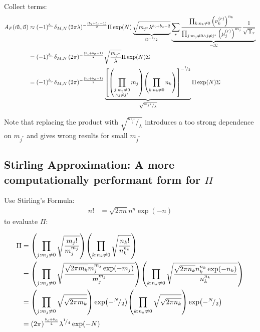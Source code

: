 \documentclass[
	english,
	a4paper,
	fontsize=10pt,
	parskip=half,
	titlepage=true,
	DIV=12,
	final
]{scrreprt}
\newcommand*{\smallfrac}  [2]{\ensuremath{{}^        {#1} \!/_        {#2}}}
\begin{document}
Collect terms:
\begin{align}
		A_F(\vec{m}, \vec{n})
&\approx
	(-1)^{b_o} \,	
	\delta_{M,N} \,
	(2\pi \lambda)^{-\frac{(b_i + b_o - 1)}{2}}
	\Pi
	\exp(N)
	\underbrace{
		\sqrt{m_{j^*} \lambda^{b_i + b_o - 2}}
	}_{\Omega^{-\smallfrac{1}{2}}}
	\underbrace{
		\sum_{r}	
		\frac
			{\prod_{k : n_k \neq 0}                  \qty(\nu_k^{(r)})^{n_k}}
			{\prod_{j : m_j \neq 0 \land j \neq j^*} \qty(\mu_j^{(r)})^{m_j}}
		\frac{1}{\sqrt{\Upsilon_r}}
	}_{\eqqcolon \Sigma} \\
&=
	(-1)^{b_o} \,	
	\delta_{M,N} \,
	(2\pi)^{-\frac{(b_i + b_o - 1)}{2}}
	\sqrt{
		\frac{m_{j^*}}{\lambda}
	}
	\Pi
	\exp(N)
	\Sigma \\
&=
	(-1)^{b_o} \,	
	\delta_{M,N} \,
	(2\pi)^{-\frac{(b_i + b_o - 1)}{2}}
	\underbrace{
		\qty[
			\qty(\prod_{\substack{j : m_j \neq 0\\\land j \neq j^*}} m_j)
			\qty(\prod_{          k : n_k \neq 0                   } n_k)
		]^{-\smallfrac{1}{2}}
	}_{\sqrt{\smallfrac{m_{j^*}}{\lambda}}}
	\Pi
	\exp(N)
	\Sigma
\end{align}

{\color{red}Note that replacing the product with $\sqrt{\smallfrac{m_{j^*}}{\lambda}}$ introduces a too strong dependence on $m_{j^*}$ and gives wrong results for small $m_{j^*}$}

\subsection{Stirling Approximation: A more computationally performant form for $\Pi$}
Use Stirling's Formula:
\begin{align}
	n!
&=
	\sqrt{2\pi n} n^n \exp(-n)
\end{align}
to evaluate $\Pi$:

\begin{align}
	\Pi
&=
	\qty( \prod_{j : m_j \neq 0}
		\sqrt{\frac
			{ m_j! }
			{ m_j^{m_j} }
		}
	)
	\qty( \prod_{k : n_k \neq 0}
		\sqrt{\frac
			{ n_k! }
			{ n_k^{n_k} }
		}
	) \\
&=
	\qty( \prod_{j : m_j \neq 0}
		\sqrt{\frac
			{ \sqrt{2\pi m_k} m_j^{m_j} \exp(-m_j) }
			{ m_j^{m_j} }
		}
	)
	\qty( \prod_{k : n_k \neq 0}
		\sqrt{\frac
			{ \sqrt{2\pi n_k} n_k^{n_k} \exp(-n_k) }
			{ n_k^{n_k} }
		}
	) \\
&=
	\qty( \prod_{j : m_j \neq 0}
		\sqrt{
			\sqrt{2\pi m_k}
		}
	)
	\exp(-\smallfrac{N}{2})
	\qty( \prod_{k : n_k \neq 0}
		\sqrt{
			\sqrt{2\pi n_k}
		}
	)
	\exp(-\smallfrac{N}{2}) \\
&=
	(2\pi)^{\frac{b_i + b_o}{4}}
	\lambda^{\smallfrac{1}{4}}
	\exp(-N)
\end{align}
\end{document}
